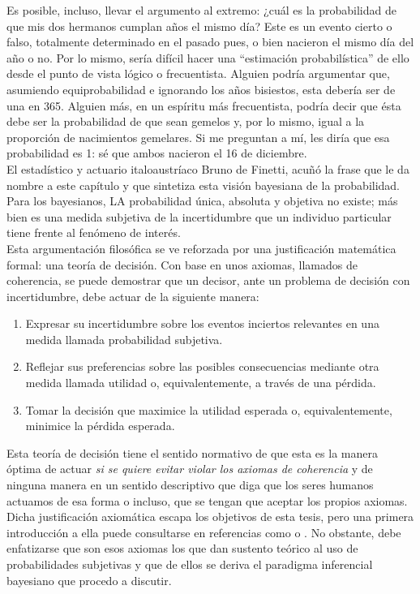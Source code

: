 	Es posible, incluso, llevar el argumento al extremo: ¿cuál es la probabilidad de que mis dos hermanos cumplan años el mismo día? Este es un evento cierto o falso, totalmente determinado en el pasado pues, o bien nacieron el mismo día del año o no. Por lo mismo, sería difícil hacer una ``estimación probabilística'' de ello desde el punto de vista lógico o frecuentista. Alguien podría argumentar que, asumiendo equiprobabilidad e ignorando los años bisiestos, esta debería ser de una en 365. Alguien más, en un espíritu más frecuentista, podría decir que ésta debe ser la probabilidad de que sean gemelos y, por lo mismo, igual a la proporción de nacimientos gemelares. Si me preguntan a mí, les diría que esa probabilidad es 1: sé que ambos nacieron el 16 de diciembre.\\	
	
	El estadístico y actuario italoaustríaco Bruno de Finetti, acuñó la frase que le da nombre a este capítulo y que sintetiza esta visión bayesiana de la probabilidad. Para los bayesianos, LA probabilidad única, absoluta y objetiva no existe; más bien es una medida subjetiva de la incertidumbre que un individuo particular tiene frente al fenómeno de interés.\\ 
	
	
	Esta argumentación filosófica se ve reforzada por una justificación matemática formal: una teoría de decisión. Con base en unos axiomas, llamados de coherencia, se puede demostrar que un decisor, ante un problema de decisión con incertidumbre, debe actuar de la siguiente manera:

\begin{enumerate}
\item Expresar su incertidumbre sobre los eventos inciertos relevantes en una medida llamada probabilidad subjetiva.
\item Reflejar sus preferencias sobre las posibles consecuencias mediante otra medida llamada utilidad o, equivalentemente, a través de una pérdida. 
\item Tomar la decisión que maximice la utilidad esperada o, equivalentemente, minimice la pérdida esperada. 
\end{enumerate}   
	
Esta teoría de decisión tiene el sentido normativo de que esta es la manera óptima de actuar \textit{si se quiere evitar violar los axiomas de coherencia} y de ninguna manera en un sentido descriptivo que diga que los seres humanos actuamos de esa forma o incluso, que se tengan que aceptar los propios axiomas. Dicha justificación axiomática escapa los objetivos de esta tesis, pero una primera introducción a ella puede consultarse en referencias como \textcite{Mendoza11} o \textcite{Bernardo81}. No obstante, debe enfatizarse que son esos axiomas los que dan sustento teórico al uso de probabilidades subjetivas y que de ellos se deriva el paradigma inferencial bayesiano que procedo a discutir.\\

